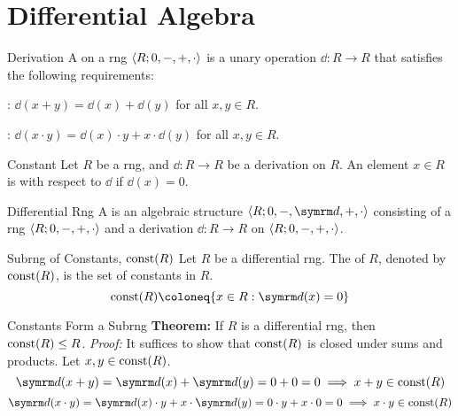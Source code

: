 
\chapter{Differential Algebra}

\begin{dfnbox}{Derivation}
	A  on a rng ${\langle {R; 0, -, +, \cdot} \rangle}$ is a unary operation $\dd: R \to R$ that satisfies the following requirements:
	\begin{dfnitems}
		\item {}: $\dd(x + y) = \dd(x) + \dd(y)$ for all $x, y \in R$.
		\item {}: $\dd(x \cdot y) = \dd(x) \cdot y + x \cdot \dd(y)$ for all $x, y \in R$.
	\end{dfnitems}
\end{dfnbox}

\begin{dfnbox}{Constant}
	Let $R$ be a rng, and $\dd: R \to R$ be a derivation on $R$. An element $x \in R$ is  with respect to $\dd$ if $\dd(x) = 0$.
\end{dfnbox}

\begin{dfnbox}{Differential Rng}
	A  is an algebraic structure $\alg{R; 0, -, \dd, +, \cdot}$ consisting of a rng ${\langle {R; 0, -, +, \cdot} \rangle}$ and a derivation $\dd: R \to R$ on ${\langle {R; 0, -, +, \cdot} \rangle}$.
\end{dfnbox}

\begin{dfnbox}{Subrng of Constants, $\operatorname{const}(R)$}
	Let $R$ be a differential rng. The  of $R$, denoted by $\operatorname{const}(R)$, is the set of constants in $R$.
	\[ \const(R) \coloneq \{ x \in R : \dd(x) = 0 \} \]
\end{dfnbox}

\begin{thmbox}{Constants Form a Subrng}
	\textbf{Theorem:} If $R$ is a differential rng, then $\operatorname{const}(R) \le R$.
\tcblower
	\textit{Proof:} It suffices to show that $\operatorname{const}(R)$ is closed under sums and products. Let $x, y \in \operatorname{const}(R)$.
	\[ \dd(x + y) = \dd(x) + \dd(y) = 0 + 0 = 0 \implies x + y \in \const(R) \]
	\[ \dd(x \cdot y) = \dd(x) \cdot y + x \cdot \dd(y) = 0 \cdot y + x \cdot 0 = 0 \implies x \cdot y \in \const(R) \]
\end{thmbox}

